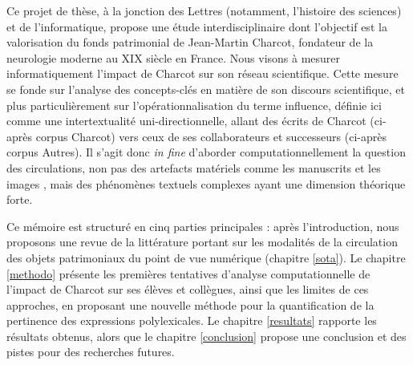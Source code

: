 Ce projet de thèse, à la jonction des Lettres (notamment, l'histoire des sciences) et de l'informatique, propose une étude interdisciplinaire dont l'objectif est la valorisation du fonds patrimonial de Jean-Martin Charcot, fondateur de la neurologie moderne au XIX\ieme{} siècle en France. Nous visons à mesurer informatiquement l'impact de Charcot sur son réseau scientifique. Cette mesure se fonde sur l'analyse des concepts-clés en matière de son discours scientifique, et plus particulièrement sur l'opérationnalisation du terme \og{}influence\fg{}, définie ici comme une intertextualité uni-directionnelle, allant des écrits de Charcot (ci-après corpus \og{}Charcot\fg{}) vers ceux de ses collaborateurs et successeurs (ci-après corpus \og{}Autres\fg{}). Il s'agit donc \textit{in fine} d'aborder computationnellement la question des circulations, non pas des artefacts matériels comme les manuscrits \citep{gabay2021katabase} et les images \citep{joyeux2019visual}, mais des phénomènes textuels complexes \citep{manjavacas} ayant une dimension théorique forte.

Ce mémoire est structuré en cinq parties principales : après l'introduction, nous proposons une revue de la littérature portant sur les modalités de la circulation des objets patrimoniaux du point de vue numérique (chapitre \ref{sota}). Le chapitre \ref{methodo} présente les premières tentatives d'analyse computationnelle de l'impact de Charcot sur ses élèves et collègues, ainsi que les limites de ces approches, en proposant une nouvelle méthode pour la quantification de la pertinence des expressions polylexicales. Le chapitre \ref{resultats} rapporte les résultats obtenus, alors que le chapitre \ref{conclusion} propose une conclusion et des pistes pour des recherches futures.










